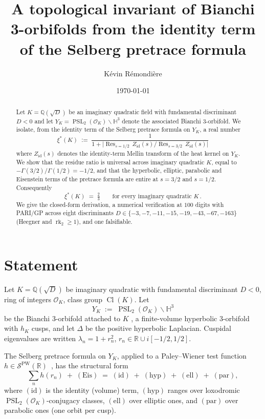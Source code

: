 \documentclass[11pt,a4paper,reqno]{amsart}
\title[A topological invariant from the Selberg identity term]
  {A topological invariant of Bianchi 3-orbifolds from the identity term of the
   Selberg pretrace formula}
\author[K.~R\'emondi\`ere]{K\'evin R\'emondi\`ere}
\date{\today}
\theoremstyle{definition}
\DeclareMathOperator{\PSL}{PSL}
\DeclareMathOperator{\Cl}{Cl}
\DeclareMathOperator{\Res}{Res}
\DeclareMathOperator{\rk}{rk}
\newcommand{\PW}{\mathcal{S}^{\mathrm{PW}}}
\newcommand{\OK}{\mathcal{O}_K}
\newcommand{\YK}{Y_K}
\newcommand{\HH}{\mathbb{H}}
\newcommand{\QQ}{\mathbb{Q}}
\newcommand{\RR}{\mathbb{R}}
\newcommand{\xis}{\xi^{*}}
\begin{document}
\begin{abstract}
Let $K=\QQ(\sqrt{D})$ be an imaginary quadratic field with fundamental discriminant $D<0$ and let $\YK = \PSL_2(\OK)\backslash\HH^3$ denote the associated Bianchi 3-orbifold. We isolate, from the identity term of the Selberg pretrace formula on $\YK$, a real number
\[
   \xis(K) \;:=\; \frac{1}{1+\bigl|\Res_{s=1/2}\,Z_{\mathrm{id}}(s)\big/\Res_{s=3/2}\,Z_{\mathrm{id}}(s)\bigr|}
\]
where $Z_{\mathrm{id}}(s)$ denotes the identity-term Mellin transform of the heat kernel on $\YK$. We show that the residue ratio is universal across imaginary quadratic $K$, equal to $-\Gamma(3/2)/\Gamma(1/2)=-1/2$, and that the hyperbolic, elliptic, parabolic and Eisenstein terms of the pretrace formula are entire at $s=3/2$ and $s=1/2$. Consequently
\[
   \xis(K) \;=\; \tfrac{2}{3} \qquad\text{for every imaginary quadratic } K\,.
\]
We give the closed-form derivation, a numerical verification at $100$ digits with PARI/GP across eight discriminants $D\in\{-3,-7,-11,-15,-19,-43,-67,-163\}$ (Heegner and $\rk_2\geq 1$), and one falsifiable.
\end{abstract}

\maketitle

\section{Statement}\label{sec:statement}

Let $K=\QQ(\sqrt{D})$ be imaginary quadratic with fundamental discriminant $D<0$, ring of integers $\OK$, class group $\Cl(K)$. Let
\[
  \YK \;:=\; \PSL_2(\OK)\backslash\HH^3
\]
be the Bianchi 3-orbifold attached to $K$ \cite[\S1.5]{ElstrodtGrunewaldMennicke1998}, a finite-volume hyperbolic 3-orbifold with $h_K$ cusps, and let $\Delta$ be the positive hyperbolic Laplacian. Cuspidal eigenvalues are written $\lambda_n=1+r_n^2$, $r_n\in\RR\cup i[-1/2,1/2]$.

The Selberg pretrace formula on $\YK$, applied to a Paley--Wiener test function $h\in\PW(\RR)$~\cite[\S6.5]{ElstrodtGrunewaldMennicke1998}, has the structural form
\begin{equation}\label{eq:selberg}
  \sum_n h(r_n) \;+\; (\mathrm{Eis})
  \;=\; (\mathrm{id}) \;+\; (\mathrm{hyp}) \;+\; (\mathrm{ell}) \;+\; (\mathrm{par}),
\end{equation}
where $(\mathrm{id})$ is the identity (volume) term, $(\mathrm{hyp})$ ranges over loxodromic $\PSL_2(\OK)$-conjugacy classes, $(\mathrm{ell})$ over elliptic ones, and $(\mathrm{par})$ over parabolic ones (one orbit per cusp).
\end{document}
